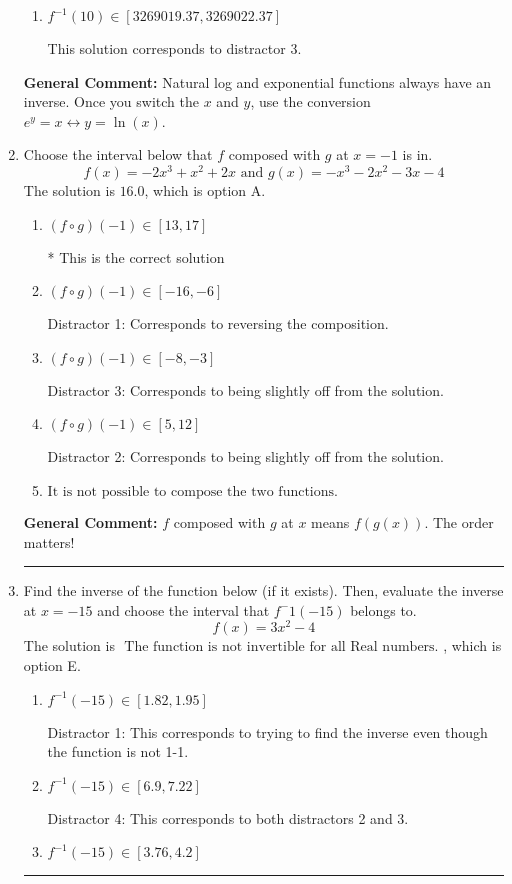 \documentclass{extbook}[14pt]
\newcommand{\litem}[1]{\item #1

\rule{\textwidth}{0.4pt}}
\begin{document}
\begin{enumerate}
{\begin{enumerate}[label=\Alph*.]
 This solution corresponds to distractor 4.
\item \( f^{-1}(10) \in [3269019.37, 3269022.37] \)

 This solution corresponds to distractor 3.
\end{enumerate}

\textbf{General Comment:} Natural log and exponential functions always have an inverse. Once you switch the $x$ and $y$, use the conversion $ e^y = x \leftrightarrow y=\ln(x)$.
}
\litem{
Choose the interval below that $f$ composed with $g$ at $x=-1$ is in.
\[ f(x) = -2x^{3} + x^{2} +2 x \text{ and } g(x) = -x^{3} -2 x^{2} -3 x -4 \]The solution is \( 16.0 \), which is option A.\begin{enumerate}[label=\Alph*.]
\item \( (f \circ g)(-1) \in [13, 17] \)

* This is the correct solution
\item \( (f \circ g)(-1) \in [-16, -6] \)

 Distractor 1: Corresponds to reversing the composition.
\item \( (f \circ g)(-1) \in [-8, -3] \)

 Distractor 3: Corresponds to being slightly off from the solution.
\item \( (f \circ g)(-1) \in [5, 12] \)

 Distractor 2: Corresponds to being slightly off from the solution.
\item \( \text{It is not possible to compose the two functions.} \)


\end{enumerate}

\textbf{General Comment:} $f$ composed with $g$ at $x$ means $f(g(x))$. The order matters!
}
\litem{
Find the inverse of the function below (if it exists). Then, evaluate the inverse at $x = -15$ and choose the interval that $f^-1(-15)$ belongs to.
\[ f(x) = 3 x^2 - 4 \]The solution is \( \text{ The function is not invertible for all Real numbers. } \), which is option E.\begin{enumerate}[label=\Alph*.]
\item \( f^{-1}(-15) \in [1.82, 1.95] \)

 Distractor 1: This corresponds to trying to find the inverse even though the function is not 1-1. 
\item \( f^{-1}(-15) \in [6.9, 7.22] \)

 Distractor 4: This corresponds to both distractors 2 and 3.
\item \( f^{-1}(-15) \in [3.76, 4.2] \)


\end{enumerate}}
\end{enumerate}
\end{document}

